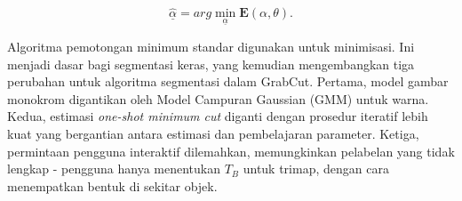 \begin{equation} \label{eq:2.9}
 \hat{\underline{\alpha}}  = arg \min_{\underline{\alpha}} \textbf{E}(\alpha,\theta).
\end{equation} 

Algoritma pemotongan minimum standar digunakan untuk minimisasi. Ini menjadi dasar 
bagi segmentasi keras, yang kemudian mengembangkan tiga perubahan untuk algoritma 
segmentasi dalam GrabCut. Pertama, model gambar monokrom digantikan oleh Model 
Campuran Gaussian (GMM) untuk warna. Kedua, estimasi \emph{one-shot minimum cut} 
diganti dengan prosedur iteratif lebih kuat yang bergantian antara estimasi dan 
pembelajaran parameter. Ketiga, permintaan pengguna interaktif dilemahkan, memungkinkan 
pelabelan yang tidak lengkap - pengguna hanya menentukan \(T_{B}\) untuk trimap, 
dengan cara menempatkan bentuk di sekitar objek.

